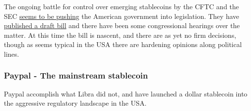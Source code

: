 The ongoing battle for control over emerging stablecoins by the CFTC and the SEC \href{
https://www.reuters.com/legal/transactional/presidents-working-group-report-calls-stablecoin-regulation-2021-12-02/}{seems to be pushing} the American government into legislation. They have \href{https://docs.house.gov/meetings/BA/BA21/20230419/115753/BILLS-118pih-Toproviderequirementsforpaymentstablecoinissuersresearchonadigitaldollarandforotherpurposes.pdf}{published a draft bill} and there have been some congressional hearings over the matter. At this time the bill is nascent, and there are as yet no firm decisions, though as seems typical in the USA there are hardening opinions along political lines.

  




\subsubsection{Paypal - The mainstream stablecoin}
Paypal accomplish what Libra did not, and have launched a dollar stablecoin into the aggressive regulatory landscape in the USA.

